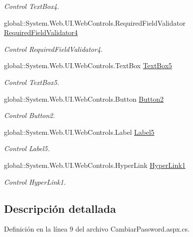 \begin{DoxyCompactItemize}
\begin{DoxyCompactList}\small\item\em Control Text\+Box4. \end{DoxyCompactList}\item 
global\+::\+System.\+Web.\+U\+I.\+Web\+Controls.\+Required\+Field\+Validator \mbox{\hyperlink{classInicio_1_1CambiarPassword_a721210b960d80ff7c87c392dc8f4d78a}{Required\+Field\+Validator4}}
\begin{DoxyCompactList}\small\item\em Control Required\+Field\+Validator4. \end{DoxyCompactList}\item 
global\+::\+System.\+Web.\+U\+I.\+Web\+Controls.\+Text\+Box \mbox{\hyperlink{classInicio_1_1CambiarPassword_a852585bbaa846d9076125c13ca2ad786}{Text\+Box5}}
\begin{DoxyCompactList}\small\item\em Control Text\+Box5. \end{DoxyCompactList}\item 
global\+::\+System.\+Web.\+U\+I.\+Web\+Controls.\+Button \mbox{\hyperlink{classInicio_1_1CambiarPassword_ab2a855fe05cc706ac07c6308af3dcc54}{Button2}}
\begin{DoxyCompactList}\small\item\em Control Button2. \end{DoxyCompactList}\item 
global\+::\+System.\+Web.\+U\+I.\+Web\+Controls.\+Label \mbox{\hyperlink{classInicio_1_1CambiarPassword_adabacc9becc23ab2219428532387a3b0}{Label5}}
\begin{DoxyCompactList}\small\item\em Control Label5. \end{DoxyCompactList}\item 
global\+::\+System.\+Web.\+U\+I.\+Web\+Controls.\+Hyper\+Link \mbox{\hyperlink{classInicio_1_1CambiarPassword_a54fe9058b0b1415263161ac543de2e4f}{Hyper\+Link1}}
\begin{DoxyCompactList}\small\item\em Control Hyper\+Link1. \end{DoxyCompactList}\end{DoxyCompactItemize}


\subsection{Descripción detallada}


Definición en la línea 9 del archivo Cambiar\+Password.\+aspx.\+cs.



